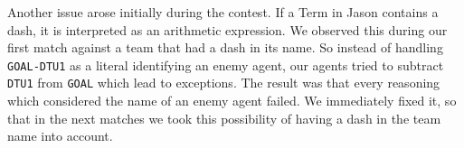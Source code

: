 Another issue arose initially during the contest.
If a Term in Jason contains a dash, it is interpreted as an arithmetic expression.
We observed this during our first match against a team that had a dash in its name.
So instead of handling \texttt{GOAL-DTU1} as a literal identifying an enemy agent, our agents tried to subtract \texttt{DTU1} from \texttt{GOAL} which lead to exceptions.
The result was that every reasoning which considered the name of an enemy agent failed.
We immediately fixed it, so that in the next matches we took this possibility of having a dash in the team name into account.
